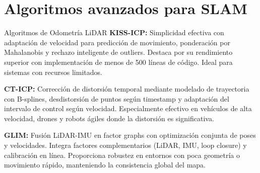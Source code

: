 \documentclass[10pt]{beamer}
\begin{document}
        \section{Algoritmos avanzados para SLAM}
        \begin{frame}{Algoritmos de Odometría LiDAR}
            \textbf{KISS-ICP:} Simplicidad efectiva con adaptación de velocidad para predicción de movimiento, ponderación por Mahalanobis y rechazo inteligente de outliers. Destaca por su rendimiento superior con implementación de menos de 500 líneas de código. Ideal para sistemas con recursos limitados.
            
            \vspace{0.5cm}
            
            \textbf{CT-ICP:} Corrección de distorsión temporal mediante modelado de trayectoria con B-splines, desdistorsión de puntos según timestamp y adaptación del intervalo de control según velocidad. Especialmente efectivo en vehículos de alta velocidad, drones y robots ágiles donde la distorsión es significativa.
            
            \vspace{0.5cm}
            
            \textbf{GLIM:} Fusión LiDAR-IMU en factor graphs con optimización conjunta de poses y velocidades. Integra factores complementarios (LiDAR, IMU, loop closure) y calibración en línea. Proporciona robustez en entornos con poca geometría o movimiento rápido, manteniendo la consistencia global del mapa.
        \end{frame}
\end{document}
